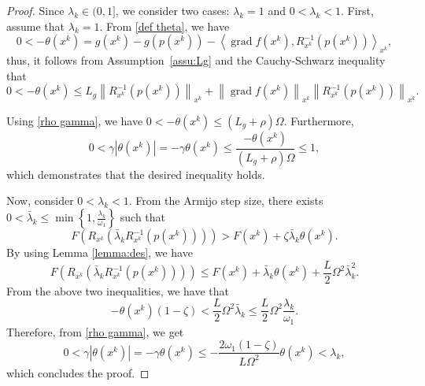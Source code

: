 \documentclass[pdflatex,sn-mathphys-num]{sn-jnl}%
\theoremstyle{definition} %
\theoremstyle{remark} %
\begin{document}
    \begin{proof}
        Since \(\lambda_k \in (0,1]\), we consider two cases: \(\lambda_k = 1\) and \(0 < \lambda_k < 1\).  
        First, assume that \(\lambda_k = 1\).
        From \eqref{def theta}, we have
        $$
        0<-\theta (x^k) = g (x^k)-g (p (x^k))-\left\langle\operatorname{grad} f (x^k), R_{x^k}^{-1} (p (x^k))\right\rangle_{x^k},
        $$
        thus, it follows from Assumption~\ref{assu:Lg} and the Cauchy-Schwarz inequality that
        $$
        0<-\theta (x^k) \leq L_g \left\|{R}^{-1}_{x^k}(p (x^k))\right\|_{x^k} 
        +\left\|\operatorname{grad} f (x^k)\right\|_{x^k}\left\|R_{x^k}^{-1} (p(x^k))\right\|_{x^k} .
        $$
        
        Using \eqref{rho gamma}, we have $0<-\theta (x^k) \leq (L_g+\rho) \Omega$. Furthermore,
        $$
        0<\gamma |\theta (x^k)| = -\gamma \theta (x^k) \leq \frac{-\theta (x^k)}{ (L_g+\rho) \Omega} \leq 1,
        $$
        which demonstrates that the desired inequality holds.
        
        Now, consider $0<\lambda_k<1$. From the Armijo step size,  there exists $0<\bar{\lambda}_k \leq \min \left\{1, \frac{\lambda_k}{\omega_1}\right\}$ such that
        $$
        F (R_{x^k} (\bar{\lambda}_k R_{x^k}^{-1} (p (x^k))))>F (x^k)+\zeta \bar{\lambda}_k \theta (x^k) .
        $$
        By using Lemma \ref{lemma:des}, we have
        $$
        F (R_{x^k} (\bar{\lambda}_k R_{x^k}^{-1} (p (x^k)))) \leq F (x^k)+\bar{\lambda}_k \theta (x^k)+\frac{L}{2}\Omega^2\bar{\lambda}_k^2.
        $$
        From the above two inequalities, we have that
        $$
        -\theta (x^k)(1-\zeta)
        <\frac{L}{2}\Omega^2 \bar{\lambda}_k 
        \leq \frac{L}{2}\Omega^2 \frac{\lambda_k}{\omega_1} .
        $$
        Therefore, from \eqref{rho gamma}, we get
        $$
        0<\gamma |\theta (x^k)| = -\gamma \theta (x^k) \leq-\frac{2 \omega_1(1-\zeta)}{L \Omega^2} \theta (x^k)<\lambda_k,
        $$
        which concludes the proof.    
    \end{proof}
\end{document}
